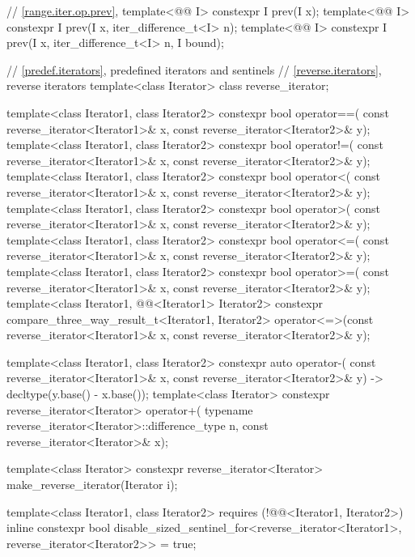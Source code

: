 \begin{codeblock}
{{    // \ref{range.iter.op.prev}, 
    template<@@ I>
      constexpr I prev(I x);
    template<@@ I>
      constexpr I prev(I x, iter_difference_t<I> n);
    template<@@ I>
      constexpr I prev(I x, iter_difference_t<I> n, I bound);
  }

  // \ref{predef.iterators}, predefined iterators and sentinels
  // \ref{reverse.iterators}, reverse iterators
  template<class Iterator> class reverse_iterator;

  template<class Iterator1, class Iterator2>
    constexpr bool operator==(
      const reverse_iterator<Iterator1>& x,
      const reverse_iterator<Iterator2>& y);
  template<class Iterator1, class Iterator2>
    constexpr bool operator!=(
      const reverse_iterator<Iterator1>& x,
      const reverse_iterator<Iterator2>& y);
  template<class Iterator1, class Iterator2>
    constexpr bool operator<(
      const reverse_iterator<Iterator1>& x,
      const reverse_iterator<Iterator2>& y);
  template<class Iterator1, class Iterator2>
    constexpr bool operator>(
      const reverse_iterator<Iterator1>& x,
      const reverse_iterator<Iterator2>& y);
  template<class Iterator1, class Iterator2>
    constexpr bool operator<=(
      const reverse_iterator<Iterator1>& x,
      const reverse_iterator<Iterator2>& y);
  template<class Iterator1, class Iterator2>
    constexpr bool operator>=(
      const reverse_iterator<Iterator1>& x,
      const reverse_iterator<Iterator2>& y);
  template<class Iterator1, @@<Iterator1> Iterator2>
    constexpr compare_three_way_result_t<Iterator1, Iterator2>
      operator<=>(const reverse_iterator<Iterator1>& x,
                  const reverse_iterator<Iterator2>& y);

  template<class Iterator1, class Iterator2>
    constexpr auto operator-(
      const reverse_iterator<Iterator1>& x,
      const reverse_iterator<Iterator2>& y) -> decltype(y.base() - x.base());
  template<class Iterator>
    constexpr reverse_iterator<Iterator>
      operator+(
    typename reverse_iterator<Iterator>::difference_type n,
    const reverse_iterator<Iterator>& x);

  template<class Iterator>
    constexpr reverse_iterator<Iterator> make_reverse_iterator(Iterator i);

  template<class Iterator1, class Iterator2>
      requires (!@@<Iterator1, Iterator2>)
    inline constexpr bool disable_sized_sentinel_for<reverse_iterator<Iterator1>,
                                                     reverse_iterator<Iterator2>> = true;

}
\end{codeblock}

